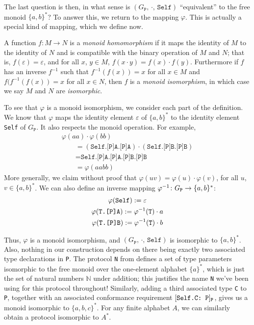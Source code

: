 \documentclass[../generics]{subfiles}
\begin{document}
The last question is then, in what sense is $(G_\texttt{P},\,\cdot,\,\texttt{Self})$ ``equivalent'' to the free monoid $\{a,b\}^*$? To answer this, we return to the mapping $\varphi$. This is actually a special kind of mapping, which we define now.

\begin{definition}
%
%
%
%
A function $f\colon M\rightarrow N$ is a \emph{monoid homomorphism} if it maps the identity of $M$ to the identity of $N$ and is compatible with the binary operation of $M$ and $N$; that is, $f(\varepsilon)=\varepsilon$, and for all $x$, $y\in M$, $f(x\cdot y)=f(x)\cdot f(y)$. Furthermore if $f$ has an inverse $f^{-1}$ such that $f^{-1}(f(x))=x$ for all $x\in M$ and $f(f^{-1}(f(x))=x$ for all $x\in N$, then $f$ is a \emph{monoid isomorphism}, in which case we say $M$ and $N$ are \emph{isomorphic}.
\end{definition}

To see that $\varphi$ is a monoid isomorphism, we consider each part of the definition. We know that $\varphi$ maps the identity element $\varepsilon$ of $\{a,b\}^*$ to the identity element \texttt{Self} of $G_\texttt{P}$. It also respects the monoid operation. For example,
\begin{gather*}
\varphi(aa)\cdot\varphi(bb)\\
\qquad {}=(\texttt{Self.[P]A.[P]A})\cdot(\texttt{Self.[P]B.[P]B})\\
\qquad {}=\texttt{Self.[P]A.[P]A.[P]B.[P]B}\\
\qquad {}=\varphi(aabb)
\end{gather*}
More generally, we claim without proof that $\varphi(uv)=\varphi(u)\cdot\varphi(v)$, for all $u$, $v\in\{a,b\}^*$. We can also define an inverse mapping $\varphi^{-1}\colon G_\texttt{P}\rightarrow\{a,b\}^*$:
\begin{gather*}
\varphi(\texttt{Self}):=\varepsilon\\
\varphi(\texttt{\texttt{T}.[P]A}):=\varphi^{-1}(\texttt{T})\cdot a\\
\varphi(\texttt{\texttt{T}.[P]B}):=\varphi^{-1}(\texttt{T})\cdot b
\end{gather*}

Thus, $\varphi$ is a monoid isomorphism, and $(G_\texttt{P},\,\cdot,\,\texttt{Self})$ is isomorphic to $\{a,b\}^*$. Also, nothing in our construction depends on there being exactly two associated type declarations in \texttt{P}. The protocol \texttt{N} from  defines a set of type parameters isomorphic to the free monoid over the one-element alphabet $\{a\}^*$, which is just the set of natural numbers $\mathbb{N}$ under addition; this justifies the name \texttt{N} we've been using for this protocol throughout! Similarly, adding a third associated type \texttt{C} to \texttt{P}, together with an associated conformance requirement $[\texttt{Self.C:~P}]_\texttt{P}$, gives us a monoid isomorphic to $\{a,b,c\}^*$. For any finite alphabet $A$, we can similarly obtain a protocol isomorphic to $A^*$.
\end{document}
